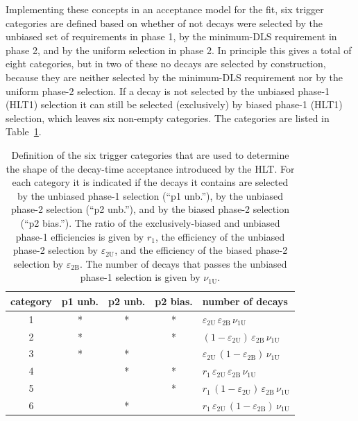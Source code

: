 Implementing these concepts in an acceptance model for the fit, six trigger categories are defined based on whether of not decays were
selected by the unbiased set of requirements in phase 1, by the minimum-DLS requirement in phase 2, and by the uniform selection in phase
2. In principle this gives a total of eight categories, but in two of these no decays are selected by construction, because they are
neither selected by the minimum-DLS requirement nor by the uniform phase-2 selection. If a decay is not selected by the unbiased phase-1
(HLT1) selection it can still be selected (exclusively) by biased phase-1 (HLT1) selection, which leaves six non-empty categories. The
categories are listed in Table~\ref{tab:triggerCats}.
\begin{table}[tbp]
  \centering
  \caption{Definition of the six trigger categories that are used to determine the shape of the decay-time acceptance
           introduced by the HLT.
           For each category it is indicated if the decays it contains are selected by the unbiased phase-1 selection (``p1 unb.''),
           by the unbiased phase-2 selection (``p2 unb.''), and by the biased phase-2 selection (``p2 bias.'').
           The ratio of the exclusively-biased and unbiased phase-1 efficiencies is given by $r_\text{1}$,
           the efficiency of the unbiased phase-2 selection by $\varepsilon_\text{2U}$,
           and the efficiency of the biased phase-2 selection by $\varepsilon_\text{2B}$.
           The number of decays that passes the unbiased phase-1 selection is given by $\nu_\text{1U}$.}
  \label{tab:triggerCats}
  \begin{tabular}{ccccl}
    \hline
    category  &  p1 unb.  &  p2 unb.  &  p2 bias.  &  number of decays  \\
    \hline
    1  &  *  &  *  &  *
       &  $\varepsilon_\text{2U}\, \varepsilon_\text{2B}\, \nu_\text{1U}$  \\
    2  &  *  &     &  *
       &  $(1-\varepsilon_\text{2U})\, \varepsilon_\text{2B}\, \nu_\text{1U}$  \\
    3  &  *  &  *  &
       &  $\varepsilon_\text{2U}\, (1-\varepsilon_\text{2B})\, \nu_\text{1U}$  \\
    4  &     &  *  &  *
       &  $r_\text{1}\, \varepsilon_\text{2U}\, \varepsilon_\text{2B}\, \nu_\text{1U}$  \\
    5  &     &     &  *
       &  $r_\text{1}\, (1-\varepsilon_\text{2U})\, \varepsilon_\text{2B}\, \nu_\text{1U}$  \\
    6  &     &  *  &
       &  $r_\text{1}\, \varepsilon_\text{2U}\, (1-\varepsilon_\text{2B})\, \nu_\text{1U}$  \\
    \hline
  \end{tabular}
\end{table}

